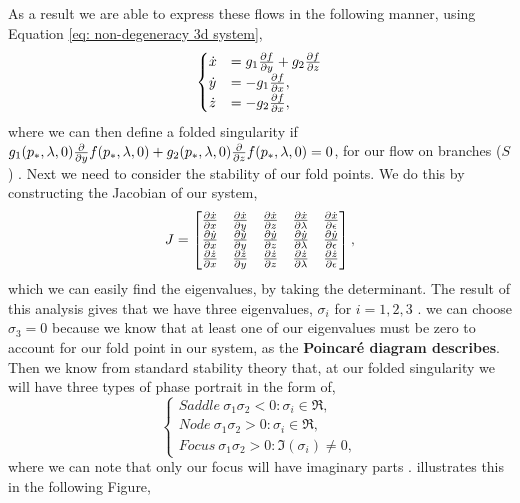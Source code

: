As a result we are able to express these flows in the following manner, using Equation \ref{eq: non-degeneracy 3d system}, 
\begin{equation}
\begin{cases}
\dot{x}&=g_1\pd{f}{y}+g_2\pd{f}{z}\\
\dot{y}&=-g_1\pd{f}{x},\\
\dot{z}&=-g_2\pd{f}{x},
\end{cases}
\end{equation}
where we can then define a folded singularity if $ g_1(p_*,\lambda,0)\pd{}{y}f(p_*,\lambda,0)+g_2(p_*,\lambda,0)\pd{}{z}f(p_*,\lambda,0)=0 $, for our flow on branches ($ S $) \citep{MMO}. Next we need to consider the stability of our fold points. We do this by constructing the Jacobian of our system, 
\begin{equation}
J=\begin{bmatrix}
\pd{\dot{x}}{x}&\pd{\dot{x}}{y}&\pd{\dot{x}}{z}&\pd{\dot{x}}{\lambda}&\pd{\dot{x}}{\epsilon}\\
\pd{\dot{y}}{x}&\pd{\dot{y}}{y}&\pd{\dot{y}}{z}&\pd{\dot{y}}{\lambda}&\pd{\dot{y}}{\epsilon}\\
\pd{\dot{z}}{x}&\pd{\dot{z}}{y}&\pd{\dot{z}}{z}&\pd{\dot{z}}{\lambda}&\pd{\dot{z}}{\epsilon}\\
\end{bmatrix},
\end{equation}
which we can easily find the eigenvalues, by taking the determinant. The result of this analysis gives that we have three eigenvalues, $ \sigma_i $ for $ i=1,2,3 $ \citep{MMO}. \Wlg we can choose $ \sigma_3=0 $ because we know that at least one of our eigenvalues must be zero to account for our fold point in our system, as the \textbf{Poincar\'e diagram describes}. Then we know from standard stability theory that, at our folded singularity we will have three types of phase portrait in the form of,
\begin{equation}
\begin{cases}
Saddle \ \sigma_1\sigma_2<0: \sigma_i\in\Re,\\
Node \ \sigma_1\sigma_2>0: \sigma_i\in\Re,\\
Focus \ \sigma_1\sigma_2>0: \Im(\sigma_i)\neq 0,
\end{cases}
\end{equation}
where we can note that only our focus will have imaginary parts \citep{MMO}. \citet{MMO} illustrates this in the following Figure, 

